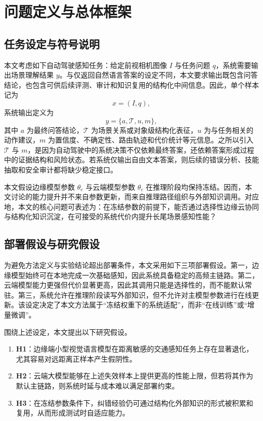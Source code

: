
\chapter{问题定义与总体框架}
\label{cha:problem}

\section{任务设定与符号说明}
\label{sec:problem-definition}

本文考虑如下自动驾驶感知任务：给定前视相机图像 $I$ 与任务问题 $q$，系统需要输出场景理解结果 $y$。与仅返回自然语言答案的设定不同，本文要求输出既包含问答结论，也包含可供后续评测、审计和知识复用的结构化中间信息。因此，单个样本记为
\begin{equation}
  x=(I,q),
\end{equation}
系统输出定义为
\begin{equation}
  y=\{a,\mathcal{T},u,m\},
\end{equation}
其中 $a$ 为最终问答结论，$\mathcal{T}$ 为场景关系或对象级结构化表征，$u$ 为与任务相关的动作建议，$m$ 为置信度、不确定性、路由轨迹和代价统计等元信息。之所以引入 $\mathcal{T}$ 与 $m$，是因为自动驾驶中的系统决策不仅依赖最终答案，还依赖答案形成过程中的证据结构和风险状态。若系统仅输出自由文本答案，则后续的错误分析、技能抽取和安全审计都将缺少稳定接口。

本文假设边缘模型参数 $\theta_e$ 与云端模型参数 $\theta_c$ 在推理阶段均保持冻结。因而，本文讨论的能力提升并不来自参数更新，而来自推理路径组织与外部知识调用。对应地，本文的核心问题可表述为：在冻结参数的前提下，能否通过选择性边缘云协同与结构化知识沉淀，在可接受的系统代价内提升长尾场景感知性能？

\section{部署假设与研究假设}
\label{sec:problem-hypothesis}

为避免方法定义与实验结论超出部署条件，本文采用如下三项部署假设。第一，边缘模型始终可在本地完成一次基础感知，因此系统具备稳定的高频主链路。第二，云端模型能力更强但代价显著更高，因此其调用只能是选择性的，而不能默认常驻。第三，系统允许在推理阶段读写外部知识，但不允许对主模型参数进行在线更新。该设定决定了本文方法属于“冻结权重下的系统适配”，而非“在线训练”或“增量微调”。

围绕上述设定，本文提出以下研究假设。

\begin{enumerate}
  \item \textbf{H1}：边缘端小型视觉语言模型在距离敏感的交通感知任务上存在显著退化，尤其容易对远距离正样本产生假阴性。
  \item \textbf{H2}：云端大模型能够在上述失效样本上提供更高的性能上限，但若将其作为默认主链路，则系统时延与成本难以满足部署约束。
  \item \textbf{H3}：在冻结参数条件下，纠错经验仍可通过结构化外部知识的形式被积累和复用，从而形成测试时自适应能力。
\end{enumerate}

